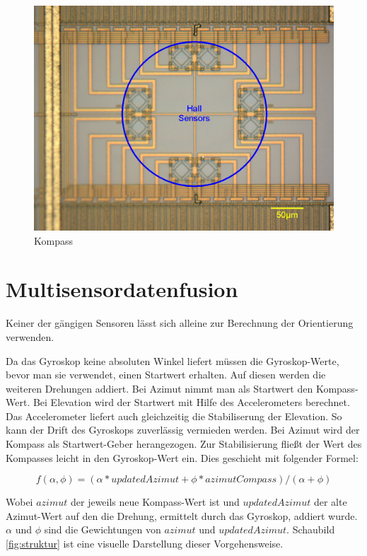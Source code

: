 \begin{figure}[htb]
\centering
\includegraphics[scale=1]{figures/compass}
\caption{Kompass \cite{memsinvestorjournal} }
\label{fig:kompass}
\end{figure}

\section{Multisensordatenfusion}
Keiner der gängigen Sensoren lässt sich alleine zur Berechnung der Orientierung verwenden.

Da das Gyroskop keine absoluten Winkel liefert müssen die Gyroskop-Werte, bevor man sie verwendet, einen Startwert erhalten. Auf diesen werden die weiteren Drehungen addiert. Bei Azimut nimmt man als Startwert den Kompass-Wert. Bei Elevation wird der Startwert mit Hilfe des Accelerometers berechnet. Das Accelerometer liefert auch gleichzeitig die Stabiliserung der Elevation. So kann der Drift des Gyroskops zuverlässig vermieden werden. Bei Azimut wird der Kompass als Startwert-Geber herangezogen. Zur Stabilisierung fließt der Wert des Kompasses leicht in den Gyroskop-Wert ein. Dies geschieht mit folgender Formel:

$$f(\alpha, \phi) = (\alpha*updatedAzimut + \phi*azimutCompass)/(\alpha+\phi)$$\label{formula001}

Wobei $azimut$ der jeweils neue Kompass-Wert ist und $updatedAzimut$ der alte Azimut-Wert auf den die Drehung, ermittelt durch das Gyroskop, addiert wurde. $\alpha$ und $\phi$ sind die Gewichtungen von $azimut$ und $updatedAzimut $. Schaubild \ref{fig:struktur} ist eine visuelle Darstellung dieser Vorgehensweise.
 

